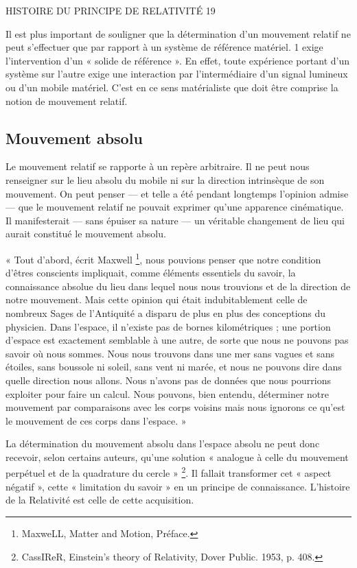HISTOIRE DU PRINCIPE DE RELATIVITÉ 19

Il est plus important de souligner que la détermination d’un mouvement
relatif ne peut s’effectuer que par rapport à un système de référence
matériel. 1 exige l’intervention d’un « solide de référence ». En effet,
toute expérience portant d’un système sur l’autre exige une interaction
par l’intermédiaire d’un signal lumineux ou d’un mobile matériel. C’est
en ce sens matérialiste que doit être comprise la notion de mouvement
relatif.

\subsection{Mouvement absolu}

Le mouvement relatif se rapporte à un repère arbitraire. Il ne peut
nous renseigner sur le lieu absolu du mobile ni sur la direction intrinsèque
de son mouvement. On peut penser — et telle a été pendant
longtemps l’opinion admise — que le mouvement relatif ne pouvait
exprimer qu’une apparence cinématique. Il manifesterait — sans épuiser
sa nature — un véritable changement de lieu qui aurait constitué le
mouvement absolu.

« Tout d’abord, écrit Maxwell \footnote{MaxweLL, Matter and Motion, Préface.}, nous pouvions penser que notre
condition d’êtres conscients impliquait, comme éléments essentiels du
savoir, la connaissance absolue du lieu dans lequel nous nous trouvions
et de la direction de notre mouvement. Mais cette opinion qui était
indubitablement celle de nombreux Sages de l’Antiquité a disparu de
plus en plus des conceptions du physicien. Dans l’espace, il n’existe pas
de bornes kilométriques ; une portion d’espace est exactement semblable
à une autre, de sorte que nous ne pouvons pas savoir où nous sommes.
Nous nous trouvons dans une mer sans vagues et sans étoiles, sans
boussole ni soleil, sans vent ni marée, et nous ne pouvons dire dans
quelle direction nous allons. Nous n’avons pas de données que nous
pourrions exploiter pour faire un calcul. Nous pouvons, bien entendu,
déterminer notre mouvement par comparaisons avec les corps voisins
mais nous ignorons ce qu’est le mouvement de ces corps dans l’espace. »

La détermination du mouvement absolu dans l’espace absolu ne peut
donc recevoir, selon certains auteurs, qu’une solution « analogue à celle
du mouvement perpétuel et de la quadrature du cercle » \footnote{CassIReR, Einstein’s theory of Relativity, Dover Public. 1953, p. 408.}. Il fallait
transformer cet « aspect négatif », cette « limitation du savoir » en un
principe de connaissance. L’histoire de la Relativité est celle de cette
acquisition.

